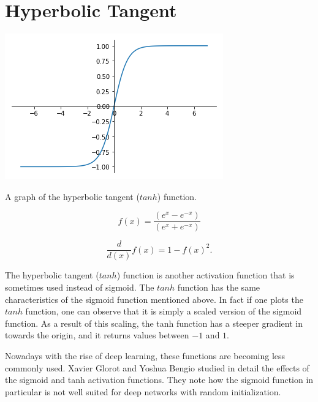 \section{Hyperbolic Tangent}\label{sec:tanh}
\begin{marginfigure}
  \includegraphics{graphics/activation_functions/tanh_function.png}
  \label{fig:tanhfunction}
  \caption{
    A graph of the hyperbolic tangent ($tanh$) function.
  }
\end{marginfigure}

\begin{equation}\label{tanhfunction}
    f(x) = \frac{(e^{x} - e^{-x})}{(e^{x} + e^{-x})}
\end{equation}

\begin{equation}\label{tanhfunctionderivative}
    \frac{d}{d(x)}f(x) = 1-f(x)^2.
\end{equation}

The hyperbolic tangent ($tanh$) function is another activation function that is sometimes used instead of sigmoid. The $tanh$ function has the same characteristics of the sigmoid function mentioned above. In fact if one plots the $tanh$ function, one can observe that it is simply a scaled version of the sigmoid function. As a result of this scaling, the tanh function has a steeper gradient in towards the origin, and it returns values between $-1$ and $1$.

Nowadays with the rise of deep learning, these functions are becoming less commonly used. Xavier Glorot and Yoshua Bengio studied in detail the effects of the sigmoid and tanh activation functions. They note how the sigmoid function in particular is not well suited for deep networks with random initialization\cite{glorot2010understanding}.

